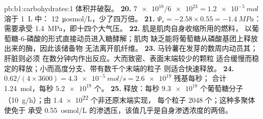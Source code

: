 \begin{solution}{pb:b1:carbohydrates:1}
体积并破裂。
\textbf{20.} $\num{7e18}/\num{6e23} = \qty{1.2e-5}{mol}$ 溶于 \qty{1}{L} 中：
\qty{12}{\micro osmol/L}，少了四万倍。
\textbf{21.} $\Psi_s = -2.58\times 0.55 = \qty{-1.4}{MPa}$：
需要承受 \qty{1.4}{MPa}，即十四个大气压。
\textbf{22.} 肌是肌肉自身收缩所用的燃料，
以葡萄糖-6-磷酸的形式直接动员进入糖酵解；肌肉
缺乏能将葡萄糖从磷酸基团上释放出来的酶，因此该储备物
无法离开肌纤维。
\textbf{23.} 马铃薯在发芽的数周内动员其；肝脏则必须
在数分钟内作出反应。大而致密、表面末端较少的颗粒
适合缓慢而稳定的释放；小而高度分支、带有数千个末端的粒子
则适合快速释放。
\textbf{24.} $0.62/(4\times 3600) = \qty{4.3e-5}{mol/s} = \num{2.6e19}$
残基每秒； 合计 \qty{1.24}{mol}，每秒
$\num{5.2e19}$ 个。
\textbf{25.} 释放：每秒 $\num{9.3e18}$ 个葡萄糖分子
（\qty{10}{g/h}）；由 \num{1.4e22} 个非还原末端实现，
每个粒子 \num{2048} 个；这种多聚体使免于
承受 \qty{0.55}{osmol/L} 的渗透压，该值几乎是自身渗透浓度的两倍。
\end{solution}
